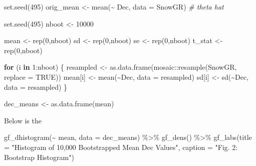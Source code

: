 \documentclass[12pt]{article}
\newenvironment{Shaded}{\begin{snugshade}}{\end{snugshade}}
\newcommand{\AttributeTok}[1]{\textcolor[rgb]{0.77,0.63,0.00}{#1}}
\newcommand{\CommentTok}[1]{\textcolor[rgb]{0.56,0.35,0.01}{\textit{#1}}}
\newcommand{\ConstantTok}[1]{\textcolor[rgb]{0.00,0.00,0.00}{#1}}
\newcommand{\ControlFlowTok}[1]{\textcolor[rgb]{0.13,0.29,0.53}{\textbf{#1}}}
\newcommand{\DecValTok}[1]{\textcolor[rgb]{0.00,0.00,0.81}{#1}}
\newcommand{\FunctionTok}[1]{\textcolor[rgb]{0.00,0.00,0.00}{#1}}
\newcommand{\NormalTok}[1]{#1}
\newcommand{\OtherTok}[1]{\textcolor[rgb]{0.56,0.35,0.01}{#1}}
\newcommand{\SpecialCharTok}[1]{\textcolor[rgb]{0.00,0.00,0.00}{#1}}
\newcommand{\StringTok}[1]{\textcolor[rgb]{0.31,0.60,0.02}{#1}}
\begin{document}
\begin{Shaded}
\begin{Highlighting}[]
\FunctionTok{set.seed}\NormalTok{(}\DecValTok{495}\NormalTok{)}
\NormalTok{orig\_mean }\OtherTok{\textless{}{-}} \FunctionTok{mean}\NormalTok{(}\SpecialCharTok{\textasciitilde{}}\NormalTok{ Dec, }\AttributeTok{data =}\NormalTok{ SnowGR) }\CommentTok{\# theta hat}

\FunctionTok{set.seed}\NormalTok{(}\DecValTok{495}\NormalTok{)}
\NormalTok{nboot }\OtherTok{\textless{}{-}} \DecValTok{10000}

\NormalTok{mean }\OtherTok{\textless{}{-}} \FunctionTok{rep}\NormalTok{(}\DecValTok{0}\NormalTok{,nboot)}
\NormalTok{sd }\OtherTok{\textless{}{-}} \FunctionTok{rep}\NormalTok{(}\DecValTok{0}\NormalTok{,nboot)}
\NormalTok{se }\OtherTok{\textless{}{-}} \FunctionTok{rep}\NormalTok{(}\DecValTok{0}\NormalTok{,nboot)}
\NormalTok{t\_stat }\OtherTok{\textless{}{-}} \FunctionTok{rep}\NormalTok{(}\DecValTok{0}\NormalTok{,nboot)}

\ControlFlowTok{for}\NormalTok{ (i }\ControlFlowTok{in} \DecValTok{1}\SpecialCharTok{:}\NormalTok{nboot) \{}
\NormalTok{  resampled }\OtherTok{\textless{}{-}} \FunctionTok{as.data.frame}\NormalTok{(mosaic}\SpecialCharTok{::}\FunctionTok{resample}\NormalTok{(SnowGR, }\AttributeTok{replace =} \ConstantTok{TRUE}\NormalTok{))}
\NormalTok{  mean[i] }\OtherTok{\textless{}{-}} \FunctionTok{mean}\NormalTok{(}\SpecialCharTok{\textasciitilde{}}\NormalTok{Dec, }\AttributeTok{data =}\NormalTok{ resampled)}
\NormalTok{  sd[i] }\OtherTok{\textless{}{-}} \FunctionTok{sd}\NormalTok{(}\SpecialCharTok{\textasciitilde{}}\NormalTok{Dec, }\AttributeTok{data =}\NormalTok{ resampled)}
\NormalTok{\}}

\NormalTok{dec\_means }\OtherTok{\textless{}{-}} \FunctionTok{as.data.frame}\NormalTok{(mean)}
\end{Highlighting}
\end{Shaded}

Below is the

\begin{Shaded}
\begin{Highlighting}[]
\FunctionTok{gf\_dhistogram}\NormalTok{(}\SpecialCharTok{\textasciitilde{}}\NormalTok{ mean, }\AttributeTok{data =}\NormalTok{ dec\_means) }\SpecialCharTok{\%\textgreater{}\%}
  \FunctionTok{gf\_dens}\NormalTok{() }\SpecialCharTok{\%\textgreater{}\%}
  \FunctionTok{gf\_labs}\NormalTok{(}\AttributeTok{title =} \StringTok{"Histogram of 10,000 Bootstrapped Mean Dec Values"}\NormalTok{,}
          \AttributeTok{caption =} \StringTok{"Fig. 2: Bootstrap Histogram"}\NormalTok{)}
\end{Highlighting}
\end{Shaded}
\end{document}
